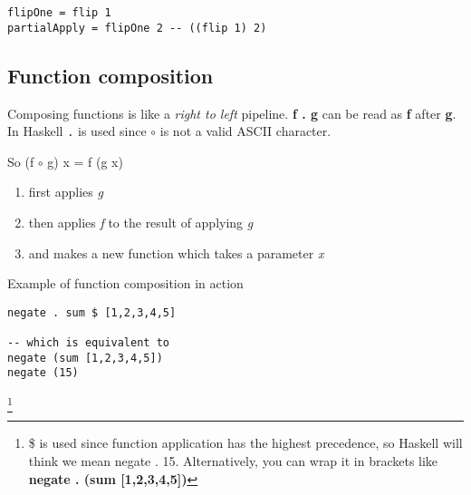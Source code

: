 \begin{lstlisting}
flipOne = flip 1
partialApply = flipOne 2 -- ((flip 1) 2)
\end{lstlisting}

\subsection{Function composition}
Composing functions is like a \emph{right to left} pipeline. \textbf{f . g} can be read
as \textbf{f} after \textbf{g}. In Haskell \lstinline{.} is used since $\circ$ is not a valid ASCII character.

So (f $\circ$ g) x = f (g x)
\begin{enumerate}
    \item first applies \emph{g}
    \item then applies \emph{f} to the result of applying \emph{g}
    \item and makes a new function which takes a parameter \emph{x}
\end{enumerate} 

Example of function composition in action
\begin{lstlisting}
negate . sum $ [1,2,3,4,5]

-- which is equivalent to
negate (sum [1,2,3,4,5])
negate (15)
\end{lstlisting}

\footnote{
    \$ is used since function application has the highest precedence, so Haskell will think we mean negate . 15.
    Alternatively, you can wrap it in brackets like \textbf{negate . (sum [1,2,3,4,5])}}